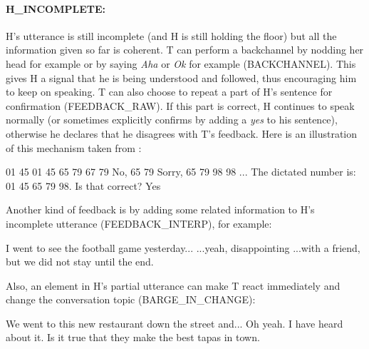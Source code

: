 					\paragraph{H\_INCOMPLETE:} H's utterance is still incomplete (and H is still holding the floor) but all the information given so far is coherent. T can perform a backchannel by nodding her head for example or by saying \textit{Aha} or \textit{Ok} for example (BACKCHANNEL). This gives H a signal that he is being understood and followed, thus encouraging him to keep on speaking. T can also choose to repeat a part of H's sentence for confirmation (FEEDBACK\_RAW). If this part is correct, H continues to speak normally (or sometimes explicitly confirms by adding a \textit{yes} to his sentence), otherwise he declares that he disagrees with T's feedback. Here is an illustration of this mechanism taken from \cite{Khouzaimi2014a}:
					
						\begin{dialogue}
							 01 45
							 01 45
							 65 79
							 67 79
							 No, 65 79
							 Sorry, 65 79
							 98
							 98
							 ...
							 The dictated number is: 01 45 65 79 98. Is that correct?
							 Yes
						\end{dialogue}
						
						Another kind of feedback is by adding some related information to H's incomplete utterance (FEEDBACK\_INTERP), for example:
						
						\begin{dialogue}
							 I went to see the football game yesterday...
							 ...yeah, disappointing
							 ...with a friend, but we did not stay until the end.
						\end{dialogue}

                                                Also, an element in H's partial utterance can make T react immediately and change the conversation topic (BARGE\_IN\_CHANGE):

                                                \begin{dialogue}
                                                   We went to this new restaurant down the street and...
                                                   Oh yeah. I have heard about it. Is it true that they make the best tapas in town.
                                                \end{dialogue}
                        
